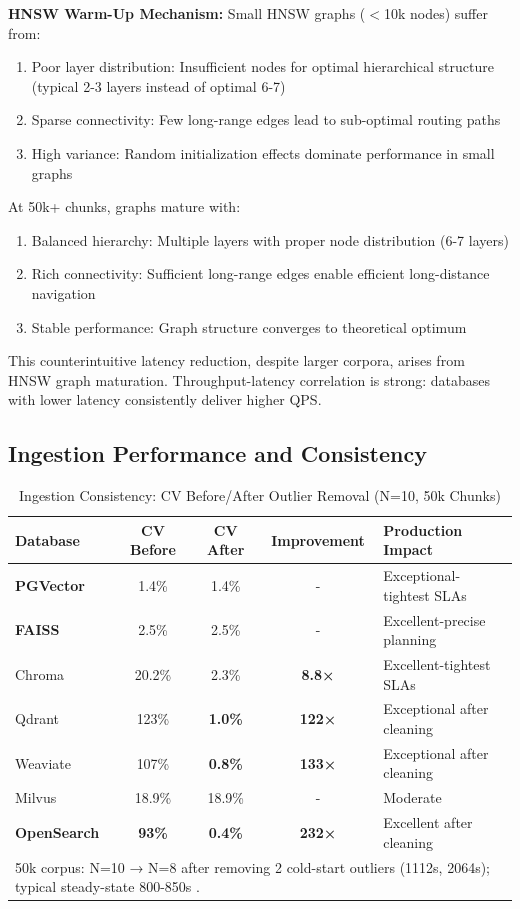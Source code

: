 \documentclass{article}
\begin{document}
\textbf{HNSW Warm-Up Mechanism:} Small HNSW graphs ($<$10k nodes) suffer from:
\begin{enumerate}
    \item Poor layer distribution: Insufficient nodes for optimal hierarchical structure (typical 2-3 layers instead of optimal 6-7)
    \item Sparse connectivity: Few long-range edges lead to sub-optimal routing paths
    \item High variance: Random initialization effects dominate performance in small graphs
\end{enumerate}

At 50k+ chunks, graphs mature with:
\begin{enumerate}
    \item Balanced hierarchy: Multiple layers with proper node distribution (6-7 layers)
    \item Rich connectivity: Sufficient long-range edges enable efficient long-distance navigation
    \item Stable performance: Graph structure converges to theoretical optimum
\end{enumerate}

This counterintuitive latency reduction, despite larger corpora, arises from HNSW graph maturation. Throughput-latency correlation is strong: databases with lower latency consistently deliver higher QPS.

\subsection{Ingestion Performance and Consistency}
\label{sec:ingestion_consistency}
\begin{table}[h]
\small
\centering
\caption{Ingestion Consistency: CV Before/After Outlier Removal (N=10, 50k Chunks)}
\begin{tabular}{lcccl}
\toprule
\textbf{Database} & \textbf{CV Before} & \textbf{CV After} & \textbf{Improvement} & \textbf{Production Impact} \\
\midrule
\textbf{PGVector} & 1.4\% & 1.4\% & - & Exceptional-tightest SLAs \\
\textbf{FAISS} & 2.5\% & 2.5\% & - & Excellent-precise planning \\
Chroma & 20.2\% & 2.3\% & \textbf{8.8×} & Excellent-tightest SLAs \\
Qdrant & 123\% & \textbf{1.0\%} & \textbf{122×} & Exceptional after cleaning \\
Weaviate & 107\% & \textbf{0.8\%} & \textbf{133×} & Exceptional after cleaning \\
Milvus & 18.9\% & 18.9\% & - & Moderate \\
\textbf{OpenSearch} & \textbf{93\%} & \textbf{0.4\%} & \textbf{232×} & Excellent after cleaning \\
\bottomrule
\multicolumn{5}{l}{\small *50k corpus: N=10 → N=8 after removing 2 cold-start outliers (1112s, 2064s); typical steady-state 800-850s
.}
\end{tabular}
\label{tab:consistency}
\end{table}
\end{document}
